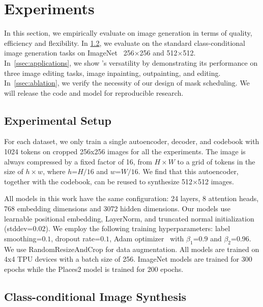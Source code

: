 
\section{Experiments}
\label{sec:experiments}

In this section, we empirically evaluate \model on image generation in terms of quality, efficiency and flexibility.
In \ref{ssec:class_conditional_synthesis}, we evaluate \model on the standard class-conditional image generation tasks on ImageNet~\cite{deng2009imagenet} 256$\times$256 and 512$\times$512.
In~\ref{ssec:applications}, we show \model's versatility by demonstrating its performance on three image editing tasks, image inpainting, outpainting, and editing. In~\ref{ssec:ablation}, we verify the necessity of our design of mask scheduling. We will release the code and model for reproducible research.


\subsection{Experimental Setup}
\label{ssec:architecture}

For each dataset, we only train a single autoencoder, decoder, and codebook with 1024 tokens on cropped 256x256 images for all the experiments. The image is always compressed by a fixed factor of 16, \ie from $H\times W$ to a grid of tokens in the size of $h \times w$, where $h$=$H / 16$ and $w$=$W/16$. We find that this autoencoder, together with the codebook, can be reused to synthesize 512$\times$512 images.

All models in this work have the same configuration: 24 layers, 8 attention heads, 768 embedding dimensions and 3072 hidden dimensions. Our models use learnable positional embedding\cite{Vaswani17attention}, LayerNorm\cite{ba2016layer}, and truncated normal initialization (stddev=$0.02$). We employ the following training hyperparameters: label smoothing=$0.1$, dropout rate=$0.1$, Adam optimizer~\cite{kingma2014adam} with $\beta_{1}$=$0.9$ and $\beta_{2}$=$0.96$. We use RandomResizeAndCrop for data augmentation. All models are trained on 4x4 TPU devices with a batch size of 256. ImageNet models are trained for 300 epochs while the Places2 model is trained for 200 epochs. 

\subsection{Class-conditional Image Synthesis}
\label{ssec:class_conditional_synthesis}

